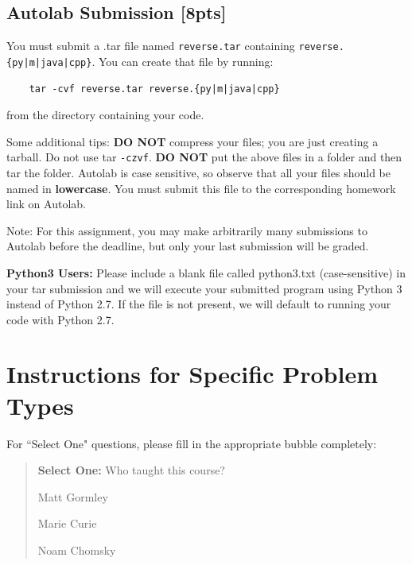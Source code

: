 \documentclass[12pt]{article}
\begin{document}
\subsection{Autolab Submission [8pts]}

You must submit a .tar file named \texttt{reverse.tar} containing \texttt{reverse.\{py|m|java|cpp\}}. You can create that file by running:
\begin{verbatim}    tar -cvf reverse.tar reverse.{py|m|java|cpp}\end{verbatim}

from the directory containing your code.

Some additional tips: \textbf{DO NOT} compress your files; you are just creating a tarball. Do not use tar \texttt{-czvf}. \textbf{DO NOT} put the above files in a folder and then tar the folder. Autolab is case sensitive, so observe that all your files should be named in \textbf{lowercase}. You must submit this file to the corresponding homework link on Autolab.

Note: For this assignment, you may make arbitrarily many submissions to Autolab before the deadline, but only your last submission will be graded.


 \begin{notebox}
  {\bf Python3 Users:} Please include a blank file called python3.txt (case-sensitive) in your tar submission and we will execute your submitted program using Python 3 instead of Python 2.7. If the file is not present, we will default to running your code with Python 2.7.
 \end{notebox}


\clearpage

\section*{Instructions for Specific Problem Types}

For ``Select One" questions, please fill in the appropriate bubble completely:

\begin{quote}
\textbf{Select One:} Who taught this course?
\begin{list}{}
     \item\CIRCLE{} Matt Gormley
     \item\Circle{} Marie Curie
     \item\Circle{} Noam Chomsky
\end{list}
\end{quote}
\end{document}
